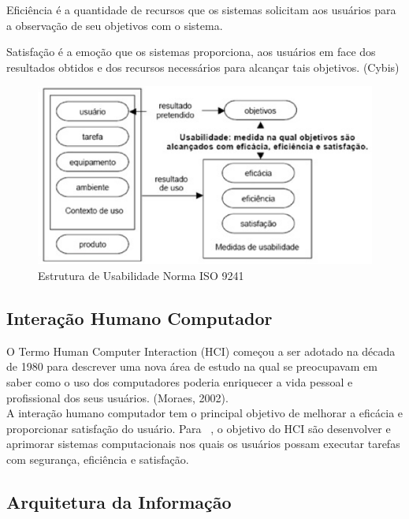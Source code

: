 	Eficiência é a quantidade de recursos que os sistemas solicitam aos usuários para a observação de seu objetivos com o sistema. ~\cite{cybis2010ergonomia}

	Satisfação é a emoção que os sistemas proporciona, aos usuários em face dos resultados obtidos e dos recursos necessários para alcançar tais objetivos. (Cybis)

\begin{figure}[h]
    \centering
    \includegraphics[keepaspectratio=true,scale=0.60]
      {figuras/estruturausabilidade9241.eps}
    \caption{Estrutura de Usabilidade Norma ISO 9241~\cite{cybis2010ergonomia}}
    \label{tdd_ciclo}
\end{figure}



\subsection{Interação Humano Computador}

	O Termo Human Computer Interaction  (HCI) começou a ser adotado na década de 1980 para descrever uma nova área de estudo na qual se preocupavam em saber como o uso dos computadores poderia enriquecer a vida pessoal e profissional dos seus usuários. (Moraes, 2002). \\
	A interação humano computador tem o principal objetivo de melhorar a eficácia e proporcionar satisfação do usuário. Para ~\cite{preece2007}, o objetivo do HCI são desenvolver e aprimorar sistemas computacionais nos quais os usuários possam executar tarefas com segurança, eficiência e satisfação.

	
\subsection{Arquitetura da Informação}

